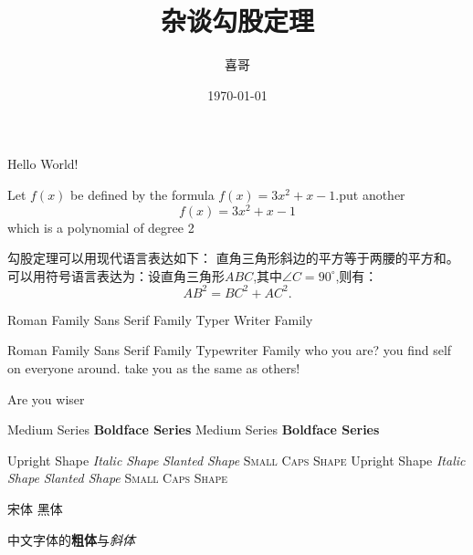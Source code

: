 \documentclass[12pt]{ctexbook}  %
\title{\heiti 杂谈勾股定理}
\author{\kaishu 喜哥}
\date{\today}
\newcommand\degree{^\circ}	%
\begin{document}
	\maketitle
	Hello World!
	
	Let $f(x)$ be defined by the formula $f(x)=3x^2+x-1$.put another $$f(x)=3x^2+x-1$$which is a polynomial of degree 2
	
	勾股定理可以用现代语言表达如下：
	直角三角形斜边的平方等于两腰的平方和。
	可以用符号语言表达为：设直角三角形$ABC$,其中$\angle C=90\degree$,则有：
	\begin{equation}
		AB^2 = BC^2 + AC^2.
	\end{equation}

	\textrm{Roman Family} \textrm{Sans Serif Family}  \textrm{Typer Writer Family}
	
	{\rmfamily Roman Family} {\sffamily Sans Serif Family} {\ttfamily Typewriter Family}
	{\sffamily who you are? you find self on everyone around. take you as the same as others! }
	
	{\ttfamily Are you wiser }
	
	\textmd{Medium Series}  \textbf{Boldface Series}
	{\mdseries Medium Series}  {\bfseries Boldface Series}
	
	\textup{Upright Shape}  \textit{Italic Shape}
	\textsl{Slanted Shape}  \textsc{Small Caps Shape}
	{\upshape Upright Shape}  {\itshape Italic Shape}
	{\slshape Slanted Shape}  {\scshape Small Caps Shape}
	
	{\songti 宋体}  {\heiti 黑体}    
	
	中文字体的\textbf{粗体}与\textit{斜体} 
	
\end{document}
